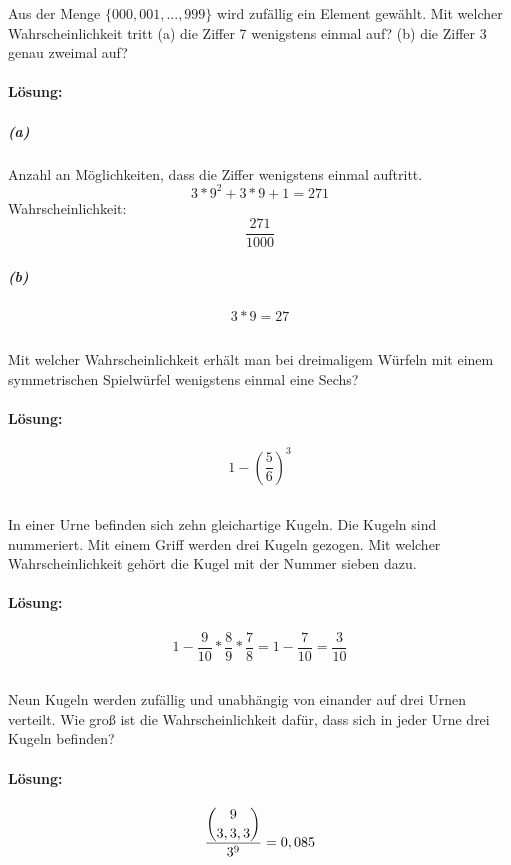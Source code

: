 \documentclass[ngerman]{scrartcl}
\begin{document}
Aus der Menge $\lbrace 000, 001, ..., 999 \rbrace$ wird zufällig ein Element gewählt. Mit welcher Wahrscheinlichkeit tritt (a) die Ziffer 7 wenigstens einmal auf? (b) die Ziffer 3 genau zweimal auf?
\paragraph{Lösung:}
\subparagraph{(a)}
Anzahl an Möglichkeiten, dass die Ziffer wenigstens einmal auftritt.
\[ 3*9^{2} + 3 * 9 + 1 = 271 \]
Wahrscheinlichkeit:
\[ \frac{271}{1000} \]
\subparagraph{(b)}
\[ 3*9 = 27 \]

\subsection{}

Mit welcher Wahrscheinlichkeit erhält man bei dreimaligem Würfeln mit einem symmetrischen Spielwürfel wenigstens einmal eine Sechs?
\paragraph{Lösung:}
\[ 1-(\frac{5}{6})^{3} \]

\subsection{}

In einer Urne befinden sich zehn gleichartige Kugeln. Die Kugeln sind nummeriert. Mit einem Griff werden drei Kugeln gezogen. Mit welcher Wahrscheinlichkeit gehört die Kugel mit der Nummer sieben dazu.
\paragraph{Lösung:}
\[ 1- \frac{9}{10} * \frac{8}{9} * \frac{7}{8} = 1-\frac{7}{10} =\frac{3}{10} \]

\subsection{}

Neun Kugeln werden zufällig und unabhängig von einander auf drei Urnen verteilt. Wie groß ist die Wahrscheinlichkeit dafür, dass sich in jeder Urne drei Kugeln befinden?
\paragraph{Lösung:}
\[ \frac{\dbinom{9}{3,3,3}}{3^9} = 0,085 \]

\subsection{}
\end{document}
